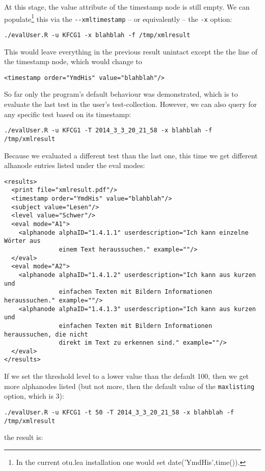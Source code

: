 \documentclass{scrartcl}
\begin{document}
At this stage, the value attribute of the timestamp node is still empty. We can populate\footnote{In the current otu.lea installation one would set date('YmdHis',time()).} this via the \verb+--xmltimestamp+ -- or equivalently -- the \verb+-x+ option:
\begin{verbatim}
./evalUser.R -u KFCG1 -x blahblah -f /tmp/xmlresult
\end{verbatim}
This would leave everything in the previous result unintact except the the line of the timestamp node, which would change to
\begin{verbatim}
<timestamp order="YmdHis" value="blahblah"/>
\end{verbatim}
So far only the program's default behaviour was demonstrated, which is to evaluate the last test in the user's test-collection. However, we can also query for any specific test based on its timestamp:
\begin{verbatim}
./evalUser.R -u KFCG1 -T 2014_3_3_20_21_58 -x blahblah -f /tmp/xmlresult
\end{verbatim}
Because we evaluated a different test than the last one, this time we get different alhanode entries listed under the eval modes: 
\begin{verbatim}
<results>
  <print file="xmlresult.pdf"/>
  <timestamp order="YmdHis" value="blahblah"/>
  <subject value="Lesen"/>
  <level value="Schwer"/>
  <eval mode="A1">
    <alphanode alphaID="1.4.1.1" userdescription="Ich kann einzelne Wörter aus 
               einem Text heraussuchen." example=""/>
  </eval>
  <eval mode="A2">
    <alphanode alphaID="1.4.1.2" userdescription="Ich kann aus kurzen und 
               einfachen Texten mit Bildern Informationen heraussuchen." example=""/>
    <alphanode alphaID="1.4.1.3" userdescription="Ich kann aus kurzen und 
               einfachen Texten mit Bildern Informationen heraussuchen, die nicht 
               direkt im Text zu erkennen sind." example=""/>
  </eval>
</results>
\end{verbatim}
If we set the threshold level to a lower value than the default 100, then we get more alphanodes listed (but not more, then the default value of the \verb+maxlisting+ option, which is 3):
\begin{verbatim}
./evalUser.R -u KFCG1 -t 50 -T 2014_3_3_20_21_58 -x blahblah -f /tmp/xmlresult
\end{verbatim}
the result is:
\end{document}
